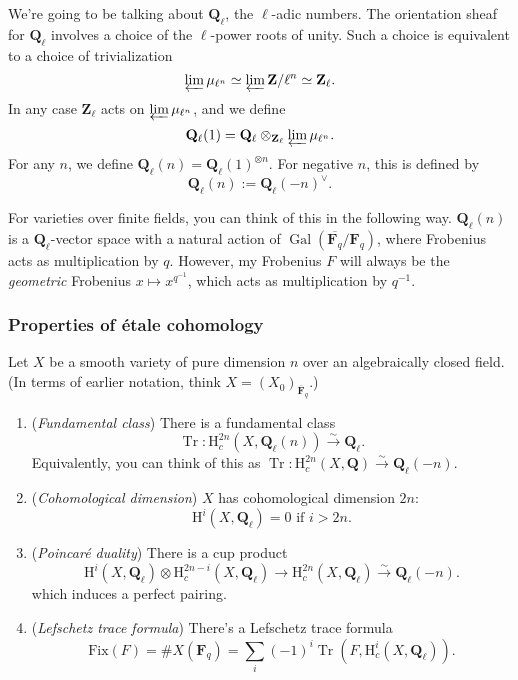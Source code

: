 \documentclass[letterpaper,11pt]{article}
\DeclareMathOperator{\Tr}{Tr}
\DeclareMathOperator{\Gal}{Gal}
\newcommand{\F}{\mathbf{F}}
\newcommand{\Q}{\mathbf{Q}}
\newcommand{\Z}{\mathbf{Z}}
\newcommand{\ol}[1]{\overline{#1}}
\newcommand{\mrm}[1]{\mathrm{#1}}
\begin{document}
We're going to be talking about $\Q_{\ell}$, the $\ell$-adic numbers. The orientation sheaf for $\Q_{\ell}$ involves a choice of the $\ell$-power roots of unity. Such a choice is equivalent to a choice of trivialization 
\[
\varprojlim \mu_{\ell^n} \simeq \varprojlim \Z/\ell^n \simeq \Z_{\ell}.
\]
In any case $\Z_{\ell}$ acts on $\varprojlim \mu_{\ell^n} $, and we define 
\[
\Q_{\ell}(1) = \Q_{\ell} \otimes_{\Z_{\ell}} \varprojlim \mu_{\ell^n}.
\]
For any $n$, we define $\Q_{\ell}(n) = \Q_{\ell}(1)^{\otimes n}$. For negative $n$, this is defined by 
\[
\Q_{\ell}(n) := \Q_{\ell}(-n)^{\vee}.
\]

\begin{remark} For varieties over finite fields, you can think of this in the following way. $\Q_{\ell}(n)$ is a $\Q_{\ell}$-vector space with a natural action of $\Gal(\ol{\F_q}/\F_q)$, where Frobenius acts as multiplication by $q$. However, my Frobenius $F$ will always be the \emph{geometric} Frobenius $x \mapsto x^{q^{-1}}$, which acts as multiplication by $q^{-1}$. \\
\end{remark}

\subsubsection{Properties of \'{e}tale cohomology}
 Let $X$ be a smooth variety of pure dimension $n$  over an algebraically closed field. (In terms of earlier notation, think $X = (X_0)_{\ol{\F}_q}$.) 
\begin{enumerate}
\item (\emph{Fundamental class}) There is a fundamental class 
\[
\Tr \colon \mrm{H}_c^{2n}(X, \Q_{\ell}(n)) \xrightarrow{\sim} \Q_{\ell}.
\]
Equivalently, you can think of this as $\Tr \colon \mrm{H}_c^{2n}(X, \Q) \xrightarrow{\sim} \Q_{\ell}(-n)$. 

\item (\emph{Cohomological dimension}) $X$ has cohomological dimension $2n$: 
\[
\mrm{H}^i(X, \Q_{\ell}) =0 \text{ if }i>2n.
\]
\item (\emph{Poincar\'{e} duality}) There is a cup product 
\[
\mrm{H}^i(X, \Q_{\ell}) \otimes \mrm{H}^{2n-i}_c (X, \Q_{\ell})  \rightarrow \mrm{H}_c^{2n}(X, \Q_{\ell}) \xrightarrow{\sim} \Q_{\ell}(-n).
\]
which induces a perfect pairing. 
\item (\emph{Lefschetz trace formula}) There's a Lefschetz trace formula
\[
\mrm{Fix}(F) = \# X(\F_q) = \sum_i (-1)^i \Tr(F, \mrm{H}_c^i(X, \Q_{\ell}) ). 
\]
\end{enumerate}
\end{document}
